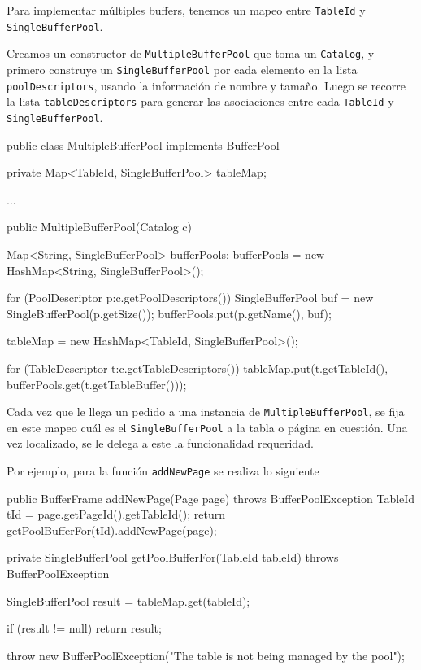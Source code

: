 \noindent
Para implementar múltiples buffers, tenemos un mapeo entre \texttt{TableId}
y \texttt{SingleBufferPool}.

\vspace*{0.5cm}

\noindent
Creamos un constructor de \texttt{MultipleBufferPool} que toma un 
\texttt{Catalog}, y primero construye un \texttt{SingleBufferPool}
por cada elemento en la lista \texttt{poolDescriptors}, usando la
información de nombre y tamaño.
Luego se recorre la lista \texttt{tableDescriptors} para generar
las asociaciones entre cada \texttt{TableId}
y \texttt{SingleBufferPool}.

\newpage

\begin{verbatimtab}[4]
public class MultipleBufferPool implements BufferPool
{
	private Map<TableId, SingleBufferPool> tableMap;

	...

	public MultipleBufferPool(Catalog c)
	{
		Map<String, SingleBufferPool> bufferPools;
		bufferPools = new HashMap<String, SingleBufferPool>();
		
		for (PoolDescriptor p:c.getPoolDescriptors())
		{
			SingleBufferPool buf = new SingleBufferPool(p.getSize());
			bufferPools.put(p.getName(), buf);
		}
		
		tableMap = new HashMap<TableId, SingleBufferPool>();
		
		for (TableDescriptor t:c.getTableDescriptors())
		{
			tableMap.put(t.getTableId(), bufferPools.get(t.getTableBuffer()));
		}
	}
}
\end{verbatimtab}

\noindent
Cada vez que le llega un pedido a una instancia de \texttt{MultipleBufferPool}, 
se fija en este mapeo cuál es el \texttt{SingleBufferPool} a la tabla
o página en cuestión. Una vez localizado, se le delega a este la funcionalidad
requeridad. 

\vspace*{0.5cm}

\noindent
Por ejemplo, para la función \texttt{addNewPage} se realiza lo siguiente

\begin{verbatimtab}[4]
public BufferFrame addNewPage(Page page) throws BufferPoolException
{
	TableId tId = page.getPageId().getTableId();
	return getPoolBufferFor(tId).addNewPage(page);
}
\end{verbatimtab}

\newpage

\begin{verbatimtab}[4]
private SingleBufferPool getPoolBufferFor(TableId tableId) 
						 throws BufferPoolException 
{
	SingleBufferPool result = tableMap.get(tableId);
		
	if (result != null)
		return result;
	
	throw new BufferPoolException("The table is not being managed by the pool");
}
\end{verbatimtab}